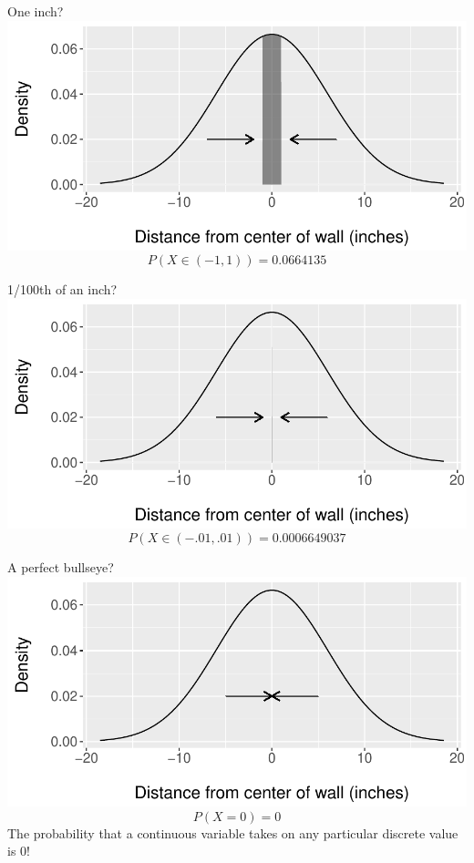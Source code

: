 \documentclass{beamer}
\begin{document}
\begin{frame}{One inch?}
\centering\includegraphics[scale=.6]{figures/Normal2.pdf}
\pause
$$P(X\in(-1, 1))=0.0664135$$
\end{frame}

\begin{frame}{1/100th of an inch?}
\centering\includegraphics[scale=.6]{figures/Normal3.pdf}
\pause
$$P(X\in(-.01, .01))=0.0006649037$$
\end{frame}


\begin{frame}{A perfect bullseye?}
\centering\includegraphics[scale=.6]{figures/Normal4.pdf}
\pause
$$P(X=0)=0$$
The probability that a continuous variable takes on any particular discrete value is \alert{0}!
\end{frame}
\end{document}
